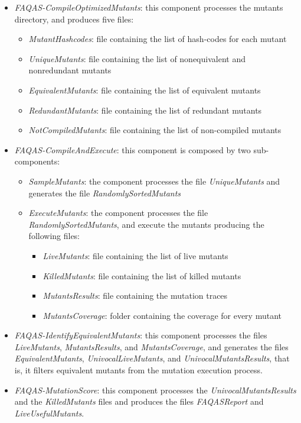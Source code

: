 \begin{itemize}
	\item \textit{FAQAS-CompileOptimizedMutants}: this component processes the mutants directory, and produces five files: 
	\begin{itemize}
		\item \textit{MutantHashcodes}: file containing the list of hash-codes for each mutant
		\item \textit{UniqueMutants}: file containing the list of nonequivalent and nonredundant mutants
		\item \textit{EquivalentMutants}: file containing the list of equivalent mutants
		\item \textit{RedundantMutants}: file containing the list of redundant mutants
		\item \textit{NotCompiledMutants}: file containing the list of non-compiled mutants
	\end{itemize}
	\item \textit{FAQAS-CompileAndExecute}: this component is composed by two sub-components:
		\begin{itemize}
			\item \textit{SampleMutants}: the component processes the file \textit{UniqueMutants} and generates the file \textit{RandomlySortedMutants}
			\item \textit{ExecuteMutants}: the component processes the file \textit{RandomlySortedMutants}, and execute the mutants producing the following files:
			\begin{itemize}
				\item \textit{LiveMutants}: file containing the list of live mutants
				\item \textit{KilledMutants}: file containing the list of killed mutants
				\item \textit{MutantsResults}: file containing the mutation traces
				\item \textit{MutantsCoverage}: folder containing the coverage for every mutant
			\end{itemize}
		\end{itemize}
	\item \textit{FAQAS-IdentifyEquivalentMutants}: this component processes the files \textit{LiveMutants}, \textit{MutantsResults}, and \textit{MutantsCoverage}, and generates the files \textit{EquivalentMutants}, \textit{UnivocalLiveMutants}, and \textit{UnivocalMutantsResults}, that is, it filters equivalent mutants from the mutation execution process.

	\item \textit{FAQAS-MutationScore}: this component processes the \textit{UnivocalMutantsResults} and the \textit{KilledMutants} files and produces the files \textit{FAQASReport} and \textit{LiveUsefulMutants}.
\end{itemize}


